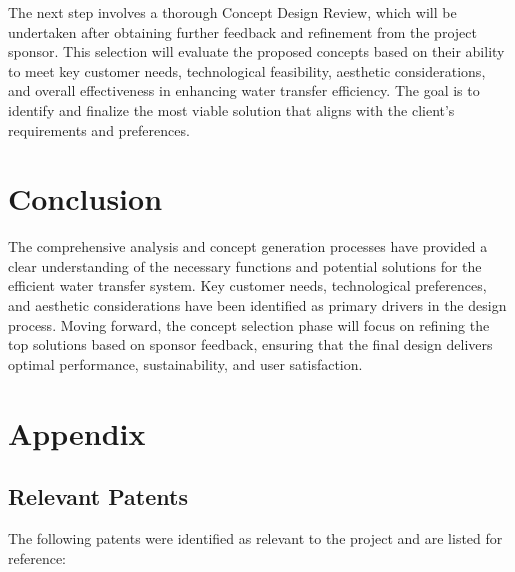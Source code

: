 \documentclass{article}
\begin{document}
The next step involves a thorough Concept Design Review, which will be undertaken after obtaining further feedback and refinement from the project sponsor. This selection will evaluate the proposed concepts based on their ability to meet key customer needs, technological feasibility, aesthetic considerations, and overall effectiveness in enhancing water transfer efficiency. The goal is to identify and finalize the most viable solution that aligns with the client's requirements and preferences.

\section*{Conclusion}

The comprehensive analysis and concept generation processes have provided a clear understanding of the necessary functions and potential solutions for the efficient water transfer system. Key customer needs, technological preferences, and aesthetic considerations have been identified as primary drivers in the design process. Moving forward, the concept selection phase will focus on refining the top solutions based on sponsor feedback, ensuring that the final design delivers optimal performance, sustainability, and user satisfaction.


\newpage
\appendix
\section{Appendix}

\subsection{Relevant Patents}
The following patents were identified as relevant to the project and are listed for reference:
\end{document}
